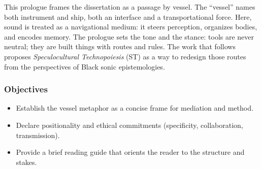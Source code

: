 

This prologue frames the dissertation as a passage by vessel. The “vessel” names both instrument and ship, both an interface and a transportational force. Here, sound is treated as a navigational medium: it steers perception, organizes bodies, and encodes memory. The prologue sets the tone and the stance: tools are never neutral; they are built things with routes and rules. The work that follows proposes \textit{Speculocultural Technopoiesis} (ST) as a way to redesign those routes from the perspectives of Black sonic epistemologies.

\subsubsection{Objectives}
\begin{itemize}[nosep]
	\item Establish the vessel metaphor as a concise frame for mediation and method.
	\item Declare positionality and ethical commitments (specificity, collaboration, transmission).
	\item Provide a brief reading guide that orients the reader to the structure and stakes.
\end{itemize}

